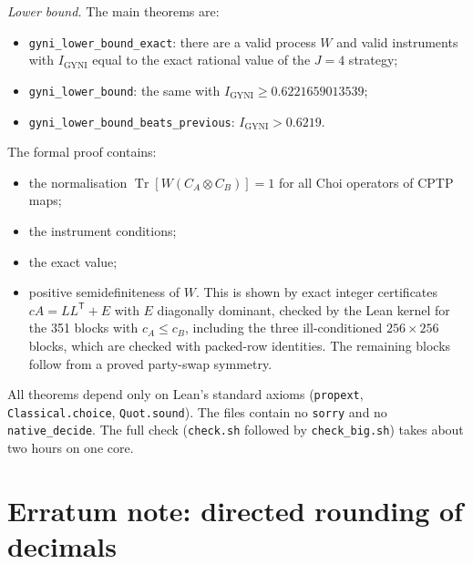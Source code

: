 \documentclass[aps,pra,onecolumn,notitlepage,superscriptaddress,longbibliography,nofootinbib,11pt]{revtex4-2}
\theoremstyle{remark}
\newcommand{\Tr}{\operatorname{Tr}}
\newcommand{\tp}{\mathsf{T}}
\newcommand{\Igy}{I_{\mathrm{GYNI}}}
\newcommand{\file}[1]{\texttt{#1}}
\begin{document}
\emph{Lower bound.} The main theorems are:
\begin{itemize}
\item \texttt{gyni\_lower\_bound\_exact}: there are a valid process $W$ and valid instruments with $\Igy$ equal to the exact rational value of the $J=4$ strategy;
\item \texttt{gyni\_lower\_bound}: the same with $\Igy\ge0.6221659013539$;
\item \texttt{gyni\_lower\_bound\_beats\_previous}: $\Igy>0.6219$.
\end{itemize}
The formal proof contains:
\begin{itemize}
\item the normalisation $\Tr[W(C_A\otimes C_B)]=1$ for all Choi operators of CPTP maps;
\item the instrument conditions;
\item the exact value;
\item positive semidefiniteness of $W$. This is shown by exact integer certificates $cA=LL^{\tp}+E$ with $E$ diagonally dominant, checked by the Lean kernel for the 351 blocks with $c_A\le c_B$, including the three ill-conditioned $256\times256$ blocks, which are checked with packed-row identities. The remaining blocks follow from a proved party-swap symmetry.
\end{itemize}
All theorems depend only on Lean's standard axioms (\texttt{propext}, \texttt{Classical.choice}, \texttt{Quot.sound}). The files contain no \texttt{sorry} and no \texttt{native\_decide}. The full check (\file{check.sh} followed by \file{check\_big.sh}) takes about two hours on one core.

\section{Erratum note: directed rounding of decimals}\label{sec:erratum}
\end{document}
